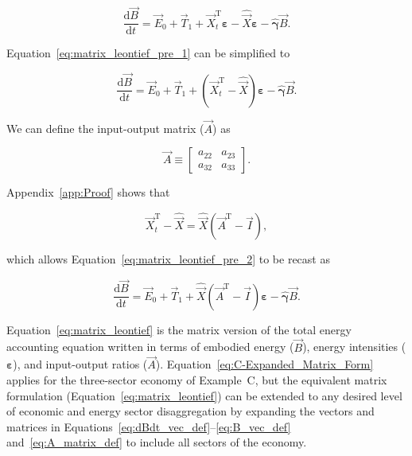 \begin{equation} \label{eq:matrix_leontief_pre_1}
	\frac{\mathrm{d}\vec{B}}{\mathrm{d}t} 
	= \vec{E}_{0}
	+ \vec{T}_{1}
	+ \vec{X}_{t}^{\mathrm{T}}\bm{\varepsilon} 
	- \hat{\vec{X}}\bm{\varepsilon}
	- \hat{\bm{\gamma}}\vec{B}.
\end{equation}

\noindent{}Equation~\ref{eq:matrix_leontief_pre_1} can be simplified to

\begin{equation} \label{eq:matrix_leontief_pre_2}
	\frac{\mathrm{d}\vec{B}}{\mathrm{d}t} 
	= \vec{E}_{0}
	+ \vec{T}_{1}
	+ (\vec{X}_{t}^{\mathrm{T}} - \hat{\vec{X}})\bm{\varepsilon} 
	- \hat{\bm{\gamma}}\vec{B}.
\end{equation}

\noindent{}We can define the input-output matrix ($\vec{A}$) as

\begin{equation} \label{eq:A_matrix_def}
	\vec{A} 
	\equiv
	\begin{bmatrix}
		a_{22} & a_{23}	\\
		a_{32} & a_{33}	
	\end{bmatrix}.
\end{equation} 

\noindent{}Appendix~\ref{app:Proof} shows that

\begin{equation} \label{eq:Xdifference1}
	\vec{X}_{t}^{\mathrm{T}} 
	- \hat{\vec{X}} 
	= \hat{\vec{X}} (\vec{A}^{\mathrm{T}} - \vec{I}),
\end{equation}

\noindent{}which allows Equation~\ref{eq:matrix_leontief_pre_2}
to be recast as

\begin{equation} \label{eq:matrix_leontief}
	\frac{\mathrm{d}\vec{B}}{\mathrm{d}t} 
	= \vec{E}_{0}
	+ \vec{T}_{1}
	+ \hat{\vec{X}} (\vec{A}^{\mathrm{T}} - \vec{I})\bm{\varepsilon} 
	- \hat{\bm{\gamma}}\vec{B}.
\end{equation}

\noindent{}Equation~\ref{eq:matrix_leontief} is the matrix version 
of the total energy accounting equation
written in terms of embodied energy ($\vec{B}$), 
energy intensities ($\bm{\varepsilon}$),
and input-output ratios ($\vec{A}$).
Equation~\ref{eq:C-Expanded_Matrix_Form} applies 
for the three-sector economy of Example~C, 
but the equivalent matrix formulation (Equation~\ref{eq:matrix_leontief}) 
can be extended to any desired level 
of economic and energy sector disaggregation 
by expanding the vectors and matrices in 
Equations~\ref{eq:dBdt_vec_def}--\ref{eq:B_vec_def}
and~\ref{eq:A_matrix_def} to include
all sectors of the economy.~\cite{Casler1984,Bullard:1978vd}

